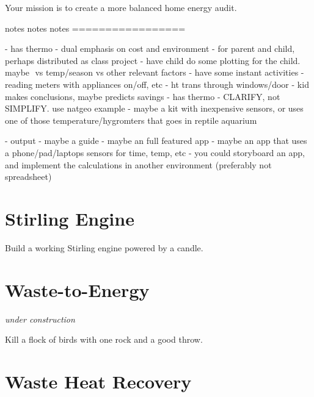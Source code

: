 \documentclass[]{tufte-book}
\newenvironment{Shaded}{}{}
\newcommand{\NormalTok}[1]{#1}
\begin{document}
Your mission is to create a more balanced home energy audit.

\begin{Shaded}
\begin{Highlighting}[numbers=left,,]

\NormalTok{notes notes notes }
\NormalTok{=================}

\NormalTok{{-} has thermo}
\NormalTok{{-} dual emphasis on cost and environment}
\NormalTok{{-} for parent and child, perhaps distributed as class project}
\NormalTok{  {-} have child do some plotting for the child. maybe $$ vs temp/season vs other relevant factors}
\NormalTok{  {-} have some instant activities}
\NormalTok{    {-} reading meters with appliances on/off, etc}
\NormalTok{    {-} ht trans through windows/door}
\NormalTok{  {-} kid makes conclusions, maybe predicts savings}
\NormalTok{{-} has thermo}
\NormalTok{  {-} CLARIFY, not SIMPLIFY. use natgeo example}
\NormalTok{  {-} maybe a kit with inexpensive sensors, or uses one of those temperature/hygromters that goes in reptile aquarium}

\NormalTok{{-} output}
\NormalTok{  {-} maybe a guide}
\NormalTok{  {-} maybe an full featured app}
\NormalTok{  {-} maybe an app that uses a phone/pad/laptop\textquotesingle{}s sensors for time, temp, etc}
\NormalTok{  {-} you could storyboard an app, and implement the calculations in another environment (preferably not spreadsheet)}
  
\end{Highlighting}
\end{Shaded}

\hypertarget{stirling-engine}{%
\chapter{Stirling Engine}\label{stirling-engine}}

Build a working Stirling engine powered by a candle.

\hypertarget{waste-to-energy}{%
\chapter{Waste-to-Energy}\label{waste-to-energy}}

\emph{under construction}

Kill a flock of birds with one rock and a good throw.

\hypertarget{waste-heat-recovery}{%
\chapter{Waste Heat Recovery}\label{waste-heat-recovery}}
\end{document}
